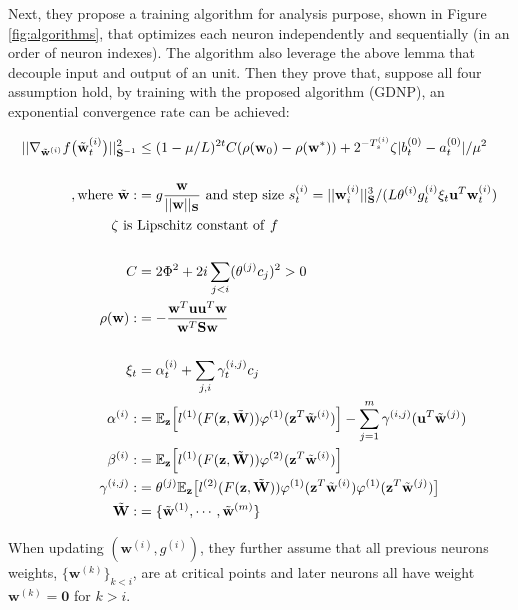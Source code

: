 \documentclass{article}
\begin{document}
Next, they propose a training algorithm for analysis purpose, shown in Figure \ref{fig:algorithms}, that optimizes each neuron independently and sequentially (in an order of neuron indexes). The algorithm also leverage the above lemma that decouple input and output of an unit. Then they prove that, suppose all four assumption hold, by training with the proposed algorithm (GDNP), an exponential convergence rate can be achieved:

\begin{align*}
    ||\nabla_{\Tilde{\textbf{w}}^{(i)}}f\big(\Tilde{\textbf{w}}_t^{(i)}\big)||^2_{\textbf{S}^{-1}}&\leq(1-\mu/L)^{2t}C(\rho(\textbf{w}_0)-\rho(\textbf{w}^*))+2^{-T_s^{(i)}}\zeta|b_t^{(0)}-a_t^{(0)}|/\mu^2\\\\
    \mathrm{, where\ }\Tilde{\textbf{w}}:&=g\frac{\textbf{w}}{||\textbf{w}||_{\textbf{S}}} \mathrm{\ and\ step\ size\ } s_t^{(i)}=||\textbf{w}_i^{(i)}||^3_{\textbf{S}}/(L\theta^{(i)}g_t^{(i)}\xi_t\textbf{u}^T\textbf{w}_t^{(i)})\\
    \zeta\mathrm{\ is\ }&\mathrm{Lipschitz\ constant\ of\ }f\\\\
    C&=2\Phi^2+2i\sum_{j<i}(\theta^{(j)}c_j)^2>0\\
    \rho(\textbf{w}):&=-\frac{\textbf{w}^T\textbf{uu}^T\textbf{w}}{\textbf{w}^T\textbf{Sw}}\\\\
    \xi_t&=\alpha_t^{(i)}+\sum_{j,i}\gamma_t^{(i,j)}c_j\\
    \alpha^{(i)}:&=\mathbb{E}_{\textbf{z}}\Big[l^{(1)}(F(\textbf{z},\Tilde{\textbf{W}}))\varphi^{(1)}(\textbf{z}^T\Tilde{\textbf{w}}^{(i)})\Big]-\sum_{j=1}^m\gamma^{(i,j)}(\textbf{u}^T\Tilde{\textbf{w}}^{(j)})\\
    \beta^{(i)}:&=\mathbb{E}_{\textbf{z}}\Big[l^{(1)}(F(\textbf{z},\Tilde{\textbf{W}}))\varphi^{(2)}(\textbf{z}^T\Tilde{\textbf{w}}^{(i)})\Big]\\
    \gamma^{(i,j)}:&=\theta^{(j)}\mathbb{E}_{\textbf{z}}\big[l^{(2)}(F(\textbf{z},\Tilde{\textbf{W}}))\varphi^{(1)}(\textbf{z}^T\Tilde{\textbf{w}}^{(i)})\varphi^{(1)}(\textbf{z}^T\Tilde{\textbf{w}}^{(j)})\big]\\
    \Tilde{\textbf{W}}:&=\{\Tilde{\textbf{w}}^{(1)},\cdots,\Tilde{\textbf{w}}^{(m)}\}
\end{align*}

When updating $(\textbf{w}^{(i)}, g^{(i)})$, they further assume that all previous neurons weights, $\{\textbf{w}^{(k)}\}_{k<i}$, are at critical points and later neurons all have weight $\textbf{w}^{(k)}=\textbf{0}$ for $k>i$.
\end{document}
